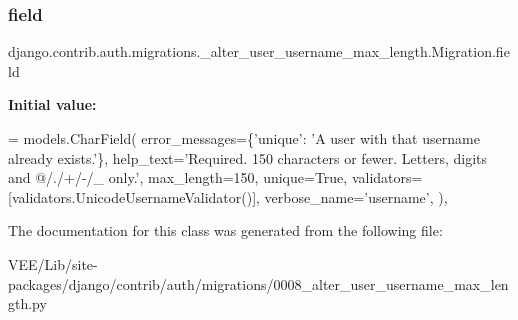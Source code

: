 \subsubsection{\texorpdfstring{field}{field}}
{\footnotesize\ttfamily django.\+contrib.\+auth.\+migrations.\+\_\+alter\+\_\+user\+\_\+username\+\_\+max\+\_\+length.\+Migration.\+field\hspace{0.3cm}{\ttfamily [static]}}

{\bfseries Initial value\+:}
\begin{DoxyCode}
= models.CharField(
                error\_messages=\{\textcolor{stringliteral}{'unique'}: \textcolor{stringliteral}{'A user with that username already exists.'}\},
                help\_text=\textcolor{stringliteral}{'Required. 150 characters or fewer. Letters, digits and @/./+/-/\_ only.'},
                max\_length=150,
                unique=\textcolor{keyword}{True},
                validators=[validators.UnicodeUsernameValidator()],
                verbose\_name=\textcolor{stringliteral}{'username'},
            ),
\end{DoxyCode}


The documentation for this class was generated from the following file\+:\begin{DoxyCompactItemize}
\item 
V\+E\+E/\+Lib/site-\/packages/django/contrib/auth/migrations/0008\+\_\+alter\+\_\+user\+\_\+username\+\_\+max\+\_\+length.\+py\end{DoxyCompactItemize}
